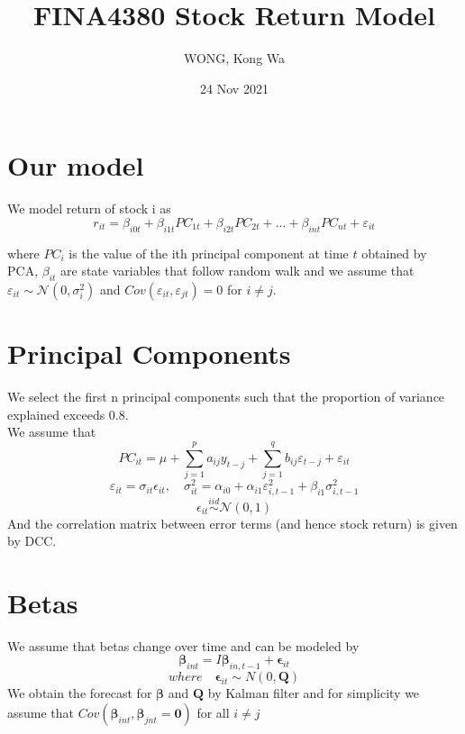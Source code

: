\documentclass{article}
\title{FINA4380 Stock Return Model}
\author{WONG, Kong Wa}
\date{24 Nov 2021}
\begin{document}
\maketitle
\raggedright
\section{Our model}
We model return of stock i as
\begin{equation*}
	r_{it}=\beta_{i0t}+\beta_{i1t}PC_{1t}+\beta_{i2t}PC_{2t}+...+\beta_{int}PC_{nt}+\varepsilon_{it}
\end{equation*}

where $PC_i$ is the value of the ith principal component at time $t$ obtained by PCA, $\beta_{it}$ are state variables that follow random walk and we assume that $\varepsilon_{it} \sim \mathcal{N}(0, \sigma_i^2)$ and $Cov(\varepsilon_{it},\varepsilon_{jt})=0$ for $i \neq j$.

\section{Principal Components}
We select the first n principal components such that the proportion of variance explained exceeds 0.8. \\
We assume that
\begin{equation*}
	PC_{it}=\mu+\sum_{j=1}^p a_{ij} y_{t-j}+\sum_{j=1}^q b_{ij} \varepsilon_{t-j}+\varepsilon_{it}
\end{equation*}
\begin{equation*}
	\varepsilon_{it}=\sigma_{it} \epsilon_{it}, \quad \sigma_{it}^2=\alpha_{i0}+\alpha_{i1} \varepsilon_{i,t-1}^2+ \beta_{i1} \sigma_{i,t-1}^2
\end{equation*}
\begin{equation*}
    \epsilon_{it} \stackrel{iid}{\sim} \mathcal{N}(0, 1)
\end{equation*}
And the correlation matrix between error terms (and hence stock return) is given by DCC.

\section{Betas}
We assume that betas change over time and can be modeled by
\begin{equation*}
    \mathbf{\beta}_{int} = I\mathbf{\beta}_{in,t-1}+\mathbf{\epsilon}_{it}
\end{equation*}
\begin{equation*}
    where \quad \mathbf{\epsilon}_{it} \sim N(0,\mathbf{Q})
\end{equation*}
We obtain the forecast for $\mathbf{\beta}$ and $\mathbf{Q}$ by Kalman filter and for simplicity we assume that $Cov(\mathbf{\beta}_{int}, \mathbf{\beta}_{jnt} = \mathbf{0})$ for all $i \neq j$
\end{document}
